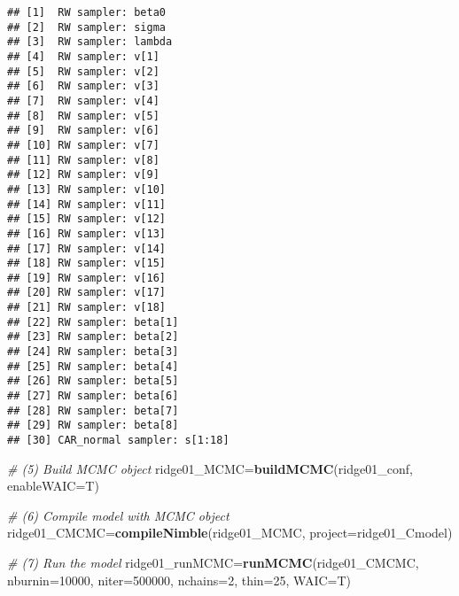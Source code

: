 \documentclass[]{article}
\newenvironment{Shaded}{\begin{snugshade}}{\end{snugshade}}
\newcommand{\CommentTok}[1]{\textcolor[rgb]{0.56,0.35,0.01}{\textit{#1}}}
\newcommand{\DataTypeTok}[1]{\textcolor[rgb]{0.13,0.29,0.53}{#1}}
\newcommand{\DecValTok}[1]{\textcolor[rgb]{0.00,0.00,0.81}{#1}}
\newcommand{\KeywordTok}[1]{\textcolor[rgb]{0.13,0.29,0.53}{\textbf{#1}}}
\newcommand{\NormalTok}[1]{#1}
\newcommand{\OperatorTok}[1]{\textcolor[rgb]{0.81,0.36,0.00}{\textbf{#1}}}
\newcommand{\StringTok}[1]{\textcolor[rgb]{0.31,0.60,0.02}{#1}}
\begin{document}
\begin{Shaded}
\end{Shaded}

\begin{verbatim}
## [1]  RW sampler: beta0
## [2]  RW sampler: sigma
## [3]  RW sampler: lambda
## [4]  RW sampler: v[1]
## [5]  RW sampler: v[2]
## [6]  RW sampler: v[3]
## [7]  RW sampler: v[4]
## [8]  RW sampler: v[5]
## [9]  RW sampler: v[6]
## [10] RW sampler: v[7]
## [11] RW sampler: v[8]
## [12] RW sampler: v[9]
## [13] RW sampler: v[10]
## [14] RW sampler: v[11]
## [15] RW sampler: v[12]
## [16] RW sampler: v[13]
## [17] RW sampler: v[14]
## [18] RW sampler: v[15]
## [19] RW sampler: v[16]
## [20] RW sampler: v[17]
## [21] RW sampler: v[18]
## [22] RW sampler: beta[1]
## [23] RW sampler: beta[2]
## [24] RW sampler: beta[3]
## [25] RW sampler: beta[4]
## [26] RW sampler: beta[5]
## [27] RW sampler: beta[6]
## [28] RW sampler: beta[7]
## [29] RW sampler: beta[8]
## [30] CAR_normal sampler: s[1:18]
\end{verbatim}

\begin{Shaded}
\begin{Highlighting}[]
\CommentTok{# (5) Build MCMC object}
\NormalTok{ridge01_MCMC=}\KeywordTok{buildMCMC}\NormalTok{(ridge01_conf, }\DataTypeTok{enableWAIC=}\NormalTok{T)}

\CommentTok{# (6) Compile model with MCMC object}
\NormalTok{ridge01_CMCMC=}\KeywordTok{compileNimble}\NormalTok{(ridge01_MCMC, }\DataTypeTok{project=}\NormalTok{ridge01_Cmodel)}

\CommentTok{# (7) Run the model}
\NormalTok{ridge01_runMCMC=}\KeywordTok{runMCMC}\NormalTok{(ridge01_CMCMC, }\DataTypeTok{nburnin=}\DecValTok{10000}\NormalTok{, }\DataTypeTok{niter=}\DecValTok{500000}\NormalTok{, }\DataTypeTok{nchains=}\DecValTok{2}\NormalTok{, }\DataTypeTok{thin=}\DecValTok{25}\NormalTok{, }\DataTypeTok{WAIC=}\NormalTok{T)}
\end{Highlighting}
\end{Shaded}
\end{document}
